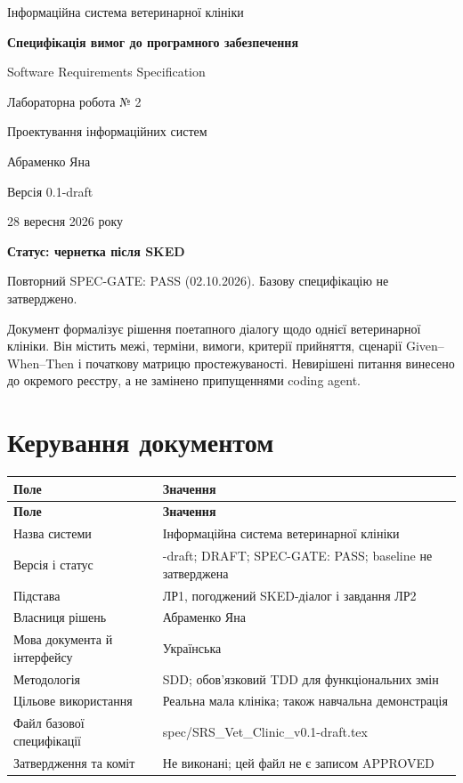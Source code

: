\documentclass[11pt,a4paper]{article}
\begin{document}
\begin{titlepage}
\centering
{\Large Інформаційна система ветеринарної клініки\par}
\vspace{12mm}
{\LARGE\bfseries Специфікація вимог до програмного забезпечення\par}
\vspace{8mm}
{\large Software Requirements Specification\par}
\vspace{12mm}
{\large Лабораторна робота № 2\par}
{\large Проектування інформаційних систем\par}
\vspace{12mm}
Абраменко Яна\par
Версія 0.1-draft\par
28 вересня 2026 року\par
\vfill
\textbf{Статус: чернетка після SKED}\par
Повторний SPEC-GATE: PASS (02.10.2026). Базову специфікацію не затверджено.\par
\vspace{8mm}
\begin{minipage}{0.94\textwidth}
Документ формалізує рішення поетапного діалогу щодо однієї ветеринарної клініки.
Він містить межі, терміни, вимоги, критерії прийняття, сценарії Given–When–Then
і початкову матрицю простежуваності. Невирішені питання винесено до окремого
реєстру, а не замінено припущеннями coding agent.
\end{minipage}
\end{titlepage}
\tableofcontents
\clearpage
\section{Керування документом}
\begin{longtable}{>{\raggedright\arraybackslash}p{4cm} >{\raggedright\arraybackslash}p{11.6cm}}
\toprule
\textbf{Поле} & \textbf{Значення} \\ \midrule
\endfirsthead
\toprule
\textbf{Поле} & \textbf{Значення} \\ \midrule
\endhead
\bottomrule
\endfoot
Назва системи & Інформаційна система ветеринарної клініки \\
Версія і статус & 0.1-draft; DRAFT; SPEC-GATE: PASS; baseline не затверджена \\
Підстава & ЛР1, погоджений SKED-діалог і завдання ЛР2 \\
Власниця рішень & Абраменко Яна \\
Мова документа й інтерфейсу & Українська \\
Методологія & SDD; обов’язковий TDD для функціональних змін \\
Цільове використання & Реальна мала клініка; також навчальна демонстрація \\
Файл базової специфікації & spec/SRS\_Vet\_Clinic\_v0.1-draft.tex \\
Затвердження та коміт & Не виконані; цей файл не є записом APPROVED \\
\end{longtable}
\end{document}

